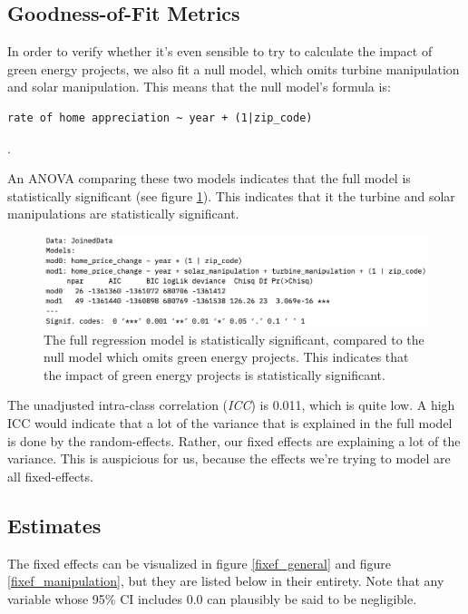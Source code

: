 \documentclass{article}
\begin{document}
\subsection{Goodness-of-Fit Metrics}
In order to verify whether it's even sensible to try to calculate the impact of green energy projects, we also fit a null model, which omits turbine manipulation and solar manipulation.
This means that the null model's formula is:
\begin{verbatim}
rate of home appreciation ~ year + (1|zip_code)
\end{verbatim}
.

An ANOVA comparing these two models indicates that the full model is statistically significant (see figure \ref{anova}).
This indicates that it the turbine and solar manipulations are statistically significant.

\begin{figure}[h]
\centering
\includegraphics[width=0.9\linewidth]
{lmer_mod_anova.jpg} 
\caption{The full regression model is statistically significant, compared to the null model which omits green energy projects. This indicates that the impact of green energy projects is statistically significant.}
\label{anova}
\end{figure}

The unadjusted intra-class correlation (\emph{ICC}) is 0.011, which is quite low.
A high ICC would indicate that a lot of the variance that is explained in the full model is done by the random-effects.
Rather, our fixed effects are explaining a lot of the variance. 
This is auspicious for us, because the effects we're trying to model are all fixed-effects.

\subsection{Estimates}

The fixed effects can be visualized in figure \ref{fixef_general} and figure \ref{fixef_manipulation}, but they are listed below in their entirety.
Note that any variable whose 95\% CI includes 0.0 can plausibly be said to be negligible.
\end{document}
